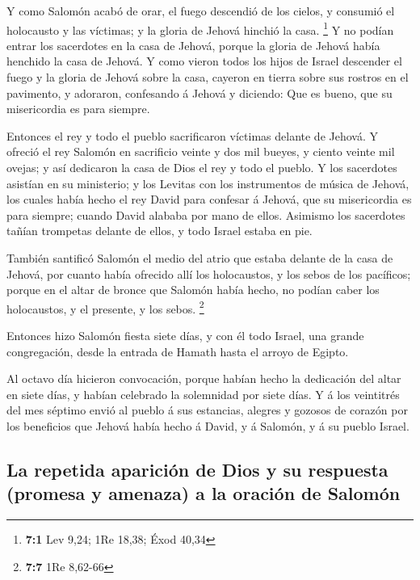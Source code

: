  Y como Salomón acabó de orar, el fuego descendió de los
cielos, y consumió el holocausto y las víctimas; y la gloria de Jehová
hinchió la casa. \footnote{\textbf{7:1} Lev 9,24; 1Re 18,38; Éxod 40,34}
 Y no podían entrar los sacerdotes en la casa de Jehová,
porque la gloria de Jehová había henchido la casa de Jehová.
 Y como vieron todos los hijos de Israel descender el
fuego y la gloria de Jehová sobre la casa, cayeron en tierra sobre sus
rostros en el pavimento, y adoraron, confesando á Jehová y diciendo: Que
es bueno, que su misericordia es para siempre.

 Entonces el rey y todo el pueblo sacrificaron víctimas
delante de Jehová.  Y ofreció el rey Salomón en sacrificio
veinte y dos mil bueyes, y ciento veinte mil ovejas; y así dedicaron la
casa de Dios el rey y todo el pueblo.  Y los sacerdotes
asistían en su ministerio; y los Levitas con los instrumentos de música
de Jehová, los cuales había hecho el rey David para confesar á Jehová,
que su misericordia es para siempre; cuando David alababa por mano de
ellos. Asimismo los sacerdotes tañían trompetas delante de ellos, y todo
Israel estaba en pie.

 También santificó Salomón el medio del atrio que estaba
delante de la casa de Jehová, por cuanto había ofrecido allí los
holocaustos, y los sebos de los pacíficos; porque en el altar de bronce
que Salomón había hecho, no podían caber los holocaustos, y el presente,
y los sebos. \footnote{\textbf{7:7} 1Re 8,62-66}

 Entonces hizo Salomón fiesta siete días, y con él todo
Israel, una grande congregación, desde la entrada de Hamath hasta el
arroyo de Egipto.

 Al octavo día hicieron convocación, porque habían hecho
la dedicación del altar en siete días, y habían celebrado la solemnidad
por siete días.  Y á los veintitrés del mes séptimo envió
al pueblo á sus estancias, alegres y gozosos de corazón por los
beneficios que Jehová había hecho á David, y á Salomón, y á su pueblo
Israel.

\hypertarget{la-repetida-apariciuxf3n-de-dios-y-su-respuesta-promesa-y-amenaza-a-la-oraciuxf3n-de-salomuxf3n}{%
\subsection{La repetida aparición de Dios y su respuesta (promesa y
amenaza) a la oración de
Salomón}\label{la-repetida-apariciuxf3n-de-dios-y-su-respuesta-promesa-y-amenaza-a-la-oraciuxf3n-de-salomuxf3n}}

